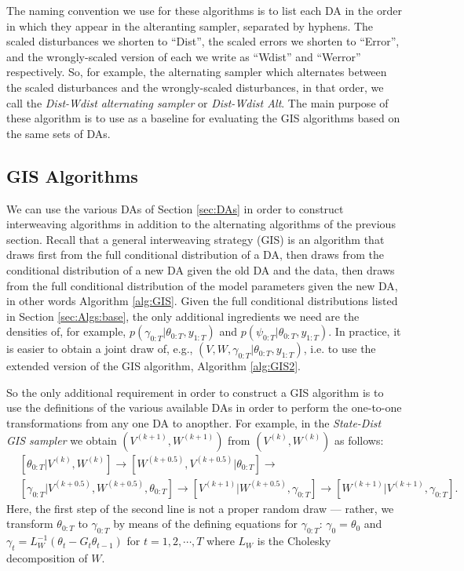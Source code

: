 \documentclass{article}
\begin{document}
The naming convention we use for these algorithms is to list each DA in the order in which they appear in the alteranting sampler, separated by hyphens. The scaled disturbances we shorten to ``Dist'', the scaled errors we shorten to ``Error'', and the wrongly-scaled version of each we write as ``Wdist'' and ``Werror'' respectively. So, for example, the alternating sampler which alternates between the scaled disturbances and the wrongly-scaled disturbances, in that order, we call the {\it Dist-Wdist alternating sampler} or {\it Dist-Wdist Alt}. The main purpose of these algorithm is to use as a baseline for evaluating the GIS algorithms based on the same sets of DAs.

\subsection{GIS Algorithms}\label{sec:Algs:GIS}
We can use the various DAs of Section \ref{sec:DAs} in order to construct interweaving algorithms in addition to the alternating algorithms of the previous section. Recall that a general interweaving strategy (GIS) is an algorithm that draws first from the full conditional distribution of a DA, then draws from the conditional distribution of a new DA given the old DA and the data, then draws from the full conditional distribution of the model parameters given the new DA, in other words Algorithm \ref{alg:GIS}. Given the full conditional distributions listed in Section \ref{sec:Algs:base}, the only additional ingredients we need are the densities of, for example, $p(\gamma_{0:T}|\theta_{0:T},y_{1:T})$ and $p(\psi_{0:T}|\theta_{0:T},y_{1:T})$. In practice, it is easier to obtain a joint draw of, e.g., $(V,W,\gamma_{0:T}|\theta_{0:T},y_{1:T})$, i.e. to use the extended version of the GIS algorithm, Algorithm \ref{alg:GIS2}.

So the only additional requirement in order to construct a GIS algorithm is to use the definitions of the various available DAs in order to perform the one-to-one transformations from any one DA to anopther. For example, in the {\it State-Dist GIS sampler} we obtain $(V^{(k+1)},W^{(k+1)})$ from $(V^{(k)},W^{(k)})$ as follows:
\begin{align*}
&[\theta_{0:T}|V^{(k)},W^{(k)}] \to [W^{(k+0.5)},V^{(k+0.5)}|\theta_{0:T}] \to\\
&[\gamma_{0:T}|V^{(k+0.5)},W^{(k+0.5)},\theta_{0:T}] \to [V^{(k+1)}|W^{(k+0.5)},\gamma_{0:T}] \to [W^{(k+1)}|V^{(k+1)},\gamma_{0:T}].
\end{align*}
Here, the first step of the second line is not a proper random draw --- rather, we transform $\theta_{0:T}$ to $\gamma_{0:T}$ by means of the defining equations for $\gamma_{0:T}$: $\gamma_0=\theta_0$ and $\gamma_t = L_W^{-1}(\theta_t - G_t\theta_{t-1})$ for $t=1,2,\cdots,T$ where $L_W$ is the Cholesky decomposition of $W$. 
\end{document}
